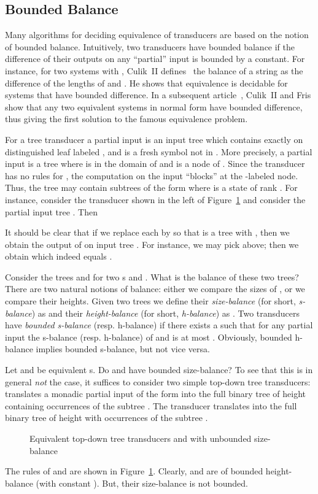 \documentclass[copyright,creativecommons]{eptcs}
\begin{document}
\subsection{Bounded Balance}

Many algorithms for deciding equivalence of transducers are based
on the notion of bounded balance. 
Intuitively, two transducers have bounded balance if 
the difference of their outputs on any ``partial''
input is bounded by a constant.
For instance, for two  systems  with ,
Culik~II defines~\cite{DBLP:journals/tcs/Culik76} the balance of a string  as the
difference of the lengths of  and . He shows that
equivalence is decidable for  systems that have bounded difference.
In a subsequent article~\cite{DBLP:journals/iandc/CulikF77}, 
Culik~II and Fris show that any two equivalent  systems
in normal form have bounded difference, thus giving the first solution to the
famous  equivalence problem.

For a tree transducer  a partial input is an input tree which contains
exactly on distinguished leaf labeled , and  is a fresh symbol
not in . More precisely, a partial input is a tree
 where  is in the domain of  and  is a node of .
Since the transducer has no rules for , the computation on the
input  ``blocks'' at the -labeled node. Thus, the tree 
may contain subtrees of the form  where  is a
state of rank . 
For instance, consider the transducer  shown in the left of
Figure~\ref{fig:MN} and consider the partial input tree
. Then

It should be clear that if we replace each  by  so
that  is a tree with ,
then we obtain the output  of  on input tree .
For instance, we may pick  above; then we obtain
 which indeed equals .

Consider the trees  and  for two s  and .
What is the balance of these two trees?
There are two natural notions of balance: either we compare the 
sizes of , or we compare their heights.
Given two trees  we define their \emph{size-balance} 
(for short, \emph{s-balance}) as  and 
their \emph{height-balance} (for short, \emph{h-balance}) as
.
Two transducers  have \emph{bounded s-balance} (resp. h-balance)
if there exists a  such that for any partial input 
the s-balance (resp. h-balance) of  and  is 
at most .
Obviously, bounded h-balance implies bounded s-balance, but not vice versa.

Let  and  be equivalent s.
Do  and  have bounded size-balance?
To see that this is in general \emph{not} the case, it suffices to consider
two simple top-down tree transducers:
 translates a monadic partial input of the form 
into the full binary tree of height  containing 
occurrences of the subtree . The transducer  translates 
 into the full binary tree of height  with
 occurrences of the subtree .
\begin{figure}[htb]

\caption{Equivalent top-down tree transducers  and 
with unbounded size-balance}\label{fig:MN}
\end{figure}
The rules of  and  are shown in Figure~\ref{fig:MN}.
Clearly,  and  are of bounded height-balance (with constant ).
But, their size-balance is not bounded.
\end{document}
